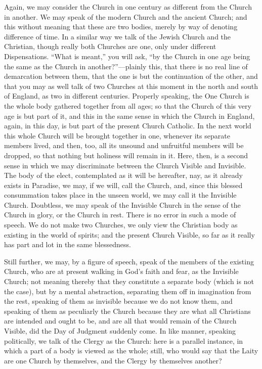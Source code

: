 Again, we may consider the Church in one century as different from
the Church in another. We may speak of the modern Church and the
ancient Church; and this without meaning that these are two bodies,
merely by way of denoting difference of time. In a similar way we talk
of the Jewish Church and the Christian, though really both Churches
are one, only under different Dispensations. ``What is
meant,'' you will ask, ``by the Church in one age being the
same as the Church in another?''—plainly this, that there is no
real line of demarcation between them, that the one is but the
continuation of the other, and that you may as well talk of two
Churches at this moment in the north and south of England, as two in
different centuries. Properly speaking, the One Church is the whole
body gathered together from all ages; so that the Church of this very
age is but part of it, and this in the same sense in which the Church
in England, again, in this day, is but part of the present Church
Catholic. In the next world this whole Church will be brought together
in one, whenever its separate members lived, and then, too, all its
unsound and unfruitful members will be dropped, so that nothing but
holiness will remain in it. Here, then, is a second sense in which we
may discriminate between the Church Visible and Invisible. The body of
the elect, contemplated as it will be hereafter, nay, as it already
exists in Paradise, we may, if we will, call the Church, and, since
this blessed consummation takes place in the unseen world, we may call
it the Invisible Church. Doubtless, we may speak of the Invisible
Church in the sense of the Church in glory, or the Church in rest.
There is no error in such a mode of speech. We do not make two
Churches, we only view the Christian body as existing in the world of
spirits; and the present Church Visible, so far as it really has part
and lot in the same blessedness.

Still further, we may, by a figure of speech, speak of the members
of the existing Church, who are at present walking in God's faith and
fear, as the Invisible Church; not meaning thereby that they
constitute a separate body (which is not the case), but by a mental
abstraction, separating them off in imagination from the rest,
speaking of them as invisible because we do not know them, and
speaking of them as peculiarly the Church because they are what all
Christians are intended and ought to be, and are all that would remain
of the Church Visible, did the Day of Judgment suddenly come. In like
manner, speaking politically, we talk of the Clergy as the Church:
here is a parallel instance, in which a part of a body is viewed as
the whole; still, who would say that the Laity are one Church by
themselves, and the Clergy by themselves another?


